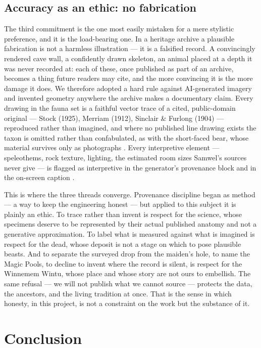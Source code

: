 \documentclass[11pt]{article}
\begin{document}
\subsection{Accuracy as an ethic: no fabrication}

The third commitment is the one most easily mistaken for a mere stylistic
preference, and it is the load-bearing one. In a heritage archive a plausible
fabrication is not a harmless illustration --- it is a falsified record. A
convincingly rendered cave wall, a confidently drawn skeleton, an animal placed
at a depth it was never recorded at: each of these, once published as part of an
archive, becomes a thing future readers may cite, and the more convincing it is
the more damage it does. We therefore adopted a hard rule against AI-generated
imagery and invented geometry anywhere the archive makes a documentary claim.
Every drawing in the fauna set is a faithful vector trace of a cited,
public-domain original --- Stock (1925), Merriam (1912), Sinclair \& Furlong
(1904) --- reproduced rather than imagined, and where no published line drawing
exists the taxon is omitted rather than confabulated, as with the short-faced
bear, whose material survives only as photographs \cite{stock25,merriam12,sf04}.
Every interpretive element --- speleothems, rock texture, lighting, the estimated
room sizes Samwel's sources never give --- is flagged as interpretive in the
generator's provenance block and in the on-screen caption \cite{sinclair04,feranec07}.

This is where the three threads converge. Provenance discipline began as method
--- a way to keep the engineering honest --- but applied to this subject it is
plainly an ethic. To trace rather than invent is respect for the science, whose
specimens deserve to be represented by their actual published anatomy and not a
generative approximation. To label what is measured against what is imagined is
respect for the dead, whose deposit is not a stage on which to pose plausible
beasts. And to separate the surveyed drop from the maiden's hole, to name the
Magic Pools, to decline to invent where the record is silent, is respect for the
Winnemem Wintu, whose place and whose story are not ours to embellish. The same
refusal --- we will not publish what we cannot source --- protects the data, the
ancestors, and the living tradition at once. That is the sense in which honesty,
in this project, is not a constraint on the work but the substance of it.

\section{Conclusion}\label{sec:conclusion}
\end{document}

